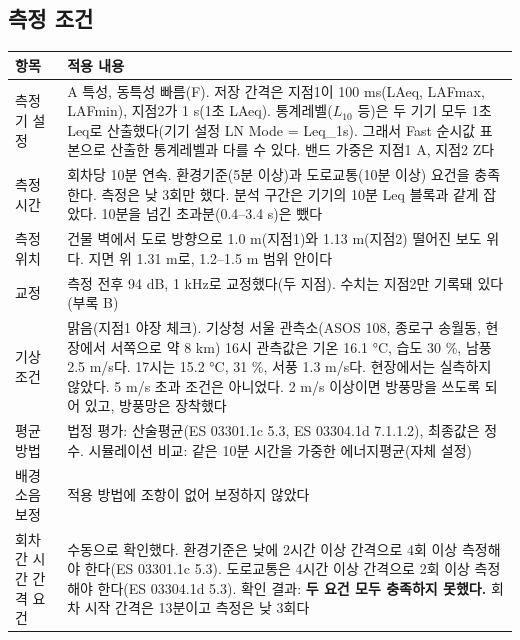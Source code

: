 \documentclass[10.5pt,a4paper]{article}
\newcommand{\hd}[1]{\cellcolor{headfill}\textbf{\sffamily #1}}
\begin{document}
\subsection{측정 조건}
\footnotesize
\begin{longtable}{L{0.22}L{0.78}}
\toprule
\hd{항목} & \hd{적용 내용} \\ \midrule
\endhead
\bottomrule
\endlastfoot
측정기 설정 & A 특성, 동특성 빠름(F). 저장 간격은 지점1이 100 ms(LAeq, LAFmax, LAFmin), 지점2가 1 s(1초 LAeq). 통계레벨($L_{10}$ 등)은 두 기기 모두 1초 Leq로 산출했다(기기 설정 LN Mode = Leq\_1s). 그래서 Fast 순시값 표본으로 산출한 통계레벨과 다를 수 있다. 밴드 가중은 지점1 A, 지점2 Z다 \\ \midrule
측정시간 & 회차당 10분 연속. 환경기준(5분 이상)과 도로교통(10분 이상) 요건을 충족한다. 측정은 낮 3회만 했다. 분석 구간은 기기의 10분 Leq 블록과 같게 잡았다. 10분을 넘긴 초과분(0.4--3.4 s)은 뺐다 \\ \midrule
측정 위치 & 건물 벽에서 도로 방향으로 1.0 m(지점1)와 1.13 m(지점2) 떨어진 보도 위다. 지면 위 1.31 m로, 1.2--1.5 m 범위 안이다 \\ \midrule
교정 & 측정 전후 94 dB, 1 kHz로 교정했다(두 지점). 수치는 지점2만 기록돼 있다(부록 B) \\ \midrule
기상 조건 & 맑음(지점1 야장 체크). 기상청 서울 관측소(ASOS 108, 종로구 송월동, 현장에서 서쪽으로 약 8 km) 16시 관측값은 기온 16.1 °C, 습도 30 \%, 남풍 2.5 m/s다. 17시는 15.2 °C, 31 \%, 서풍 1.3 m/s다. 현장에서는 실측하지 않았다. 5 m/s 초과 조건은 아니었다. 2 m/s 이상이면 방풍망을 쓰도록 되어 있고, 방풍망은 장착했다 \\ \midrule
평균 방법 & 법정 평가: 산술평균(ES 03301.1c 5.3, ES 03304.1d 7.1.1.2), 최종값은 정수. 시뮬레이션 비교: 같은 10분 시간을 가중한 에너지평균(자체 설정) \\ \midrule
배경소음 보정 & 적용 방법에 조항이 없어 보정하지 않았다 \\ \midrule
회차 간 시간 간격 요건 & 수동으로 확인했다. 환경기준은 낮에 2시간 이상 간격으로 4회 이상 측정해야 한다(ES 03301.1c 5.3). 도로교통은 4시간 이상 간격으로 2회 이상 측정해야 한다(ES 03304.1d 5.3). 확인 결과: \textbf{두 요건 모두 충족하지 못했다.} 회차 시작 간격은 13분이고 측정은 낮 3회다 \\
\end{longtable}
\addtocounter{table}{-1}
\normalsize
\end{document}

